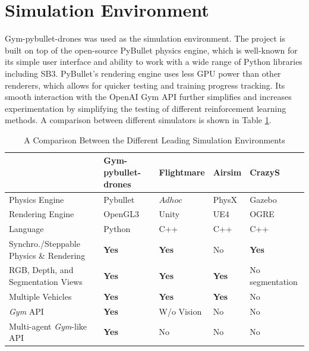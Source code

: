     \section{Simulation Environment}
    Gym-pybullet-drones was used as the simulation environment. The project is built on top of the open-source PyBullet physics engine, which is well-known for its simple user interface and ability to work with a wide range of Python libraries including SB3. PyBullet's rendering engine uses less GPU power than other renderers, which allows for quicker testing and training progress tracking. Its smooth interaction with the OpenAI Gym API further simplifies and increases experimentation by simplifying the testing of different reinforcement learning methods. A comparison between different simulators is shown in Table \ref{simulators}.
    \begin{table}[H]
    \centering
    \begin{adjustbox}{max width=\textwidth}
    \begin{tabular}{lllll}
    \hline
    & \textbf{Gym-pybullet-drones} \cite{pybullet} & \textbf{Flightmare} \cite{flightmare} & \textbf{Airsim} \cite{Airsim} & \textbf{CrazyS} \cite{crazys}\\
    \midrule
    Physics Engine & Pybullet & $Ad hoc$ & PhysX & Gazebo \\
    Rendering Engine & OpenGL3 & Unity & UE4 & OGRE \\
    Language & Python & C++ & C++ & C++ \\
    Synchro./Steppable Physics \& Rendering & \textbf{Yes} & \textbf{Yes} & No & \textbf{Yes} \\
    RGB, Depth, and Segmentation Views & \textbf{Yes} & \textbf{Yes} & \textbf{Yes} & No segmentation \\
    Multiple Vehicles & \textbf{Yes} & \textbf{Yes} & \textbf{Yes} & No \\
    \textit{Gym} API & \textbf{Yes} & W/o Vision & No & No \\
    Multi-agent \textit{Gym}-like API & \textbf{Yes} & No & No & No \\
    \hline
    \end{tabular}
    \end{adjustbox}
    \caption{A Comparison Between the Different Leading Simulation Environments \cite{pybullet}}
    \label{simulators}
    \end{table}\clearpage

